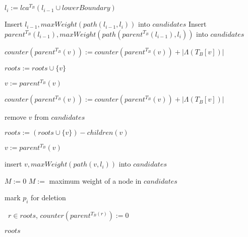 \documentclass{article}
\newcommand{\leafset}{\Lambda}
\begin{document}
\begin{algorithm}
\begin{algorithmic}[1]
                \State $l_i := lca^{T_B}(l_{i-1} \cup lowerBoundary)$

                    \State Insert $l_{i-1}, maxWeight(path(l_{i-1}, l_i))$ into $candidates$
                \Else
                    \State Insert $parent^{T_B}(l_{i-1}), maxWeight(path(parent^{T_B}(l_{i-1}), l_i))$ into $candidates$
                \EndIf

                    \State $counter(parent^{T_B}(v)) := counter(parent^{T_B}(v)) + |\leafset(T_B[v])|$

                    \State $roots := roots \cup \{v\}$

                    \State $v := parent^{T_B}(v)$

                    \While{$counter(v) = |\leafset(T_B[v])|$}
                        \State $counter(parent^{T_B}(v)) := counter(parent^{T_B}(v)) + |\leafset(T_B[v])|$

                         remove $v$ from $candidates$

                        \State $roots := (roots \cup \{v\}) - children(v)$

                        \State $v := parent^{T_B}(v)$
                    \EndWhile

                     insert $v, maxWeight(path(v, l_i))$ into $candidates$
                \EndFor

                    {$M := 0$}
                    $M :=$ maximum weight of a node in $candidates$

                \IIf{$w(\leafset(T_A[p_i])) \leq M$}
                    mark $p_i$ for deletion
            \EndFor

            \State \algorithmicforall\ $r \in roots$, $counter(parent^{T_B(r)}) := 0$

            \State \Return $roots$
        \end{algorithmic}
    \end{algorithm}
\end{document}
